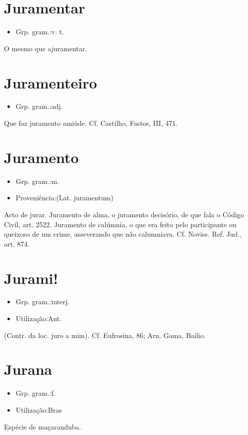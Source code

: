 \documentclass{article}
\begin{document}
\section{Juramentar}
\begin{itemize}
\item {Grp. gram.:v. t.}
\end{itemize}
O mesmo que \textunderscore ajuramentar\textunderscore .
\section{Juramenteiro}
\begin{itemize}
\item {Grp. gram.:adj.}
\end{itemize}
Que faz juramento amiúde. Cf. Castilho, \textunderscore Fastos\textunderscore , III, 471.
\section{Juramento}
\begin{itemize}
\item {Grp. gram.:m.}
\end{itemize}
\begin{itemize}
\item {Proveniência:(Lat. \textunderscore juramentum\textunderscore )}
\end{itemize}
Acto de jurar.
\textunderscore Juramento de alma\textunderscore , o juramento decisório, de que fala o \textunderscore Código Civíl\textunderscore , art. 2522.
\textunderscore Juramento de calúmnía\textunderscore , o que era feito pelo participante ou queixoso de um crime, asseverando que não calumniava. Cf. \textunderscore Noviss. Ref. Jud.\textunderscore , art. 874.
\section{Jurami!}
\begin{itemize}
\item {Grp. gram.:interj.}
\end{itemize}
\begin{itemize}
\item {Utilização:Ant.}
\end{itemize}
(Contr. da loc. \textunderscore juro a mim\textunderscore ). Cf. \textunderscore Eufrosina\textunderscore , 86; Arn. Gama, \textunderscore Bailio\textunderscore .
\section{Jurana}
\begin{itemize}
\item {Grp. gram.:f.}
\end{itemize}
\begin{itemize}
\item {Utilização:Bras}
\end{itemize}
Espécie de maçaranduba.
\end{document}
